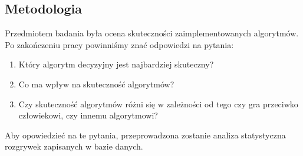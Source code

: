 \subsection{Metodologia}
\indent Przedmiotem badania była ocena skuteczności zaimplementowanych algorytmów. Po zakończeniu pracy powinniśmy znać odpowiedzi na pytania:
\begin{enumerate}
  \item Który algorytm decyzyjny jest najbardziej skuteczny?
  \item Co ma wpływ na skuteczność algorytmów?
  \item Czy skuteczność algorytmów różni się w zależności od tego czy gra przeciwko człowiekowi, czy innemu algorytmowi?
\end{enumerate}
Aby opowiedzieć na te pytania, przeprowadzona zostanie analiza statystyczna rozgrywek zapisanych w bazie danych.